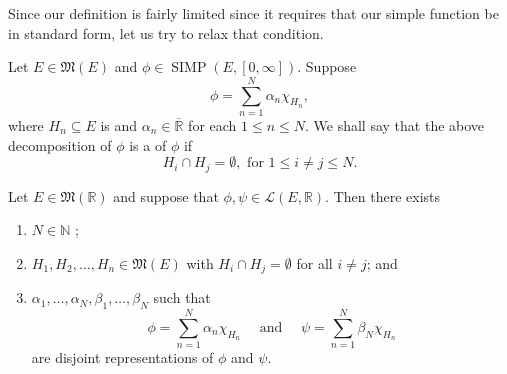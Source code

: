 \documentclass[notoc,notitlepage]{tufte-book}
\DeclareMathOperator{\SIMP}{SIMP}
\begin{document}
Since our definition is fairly limited since it requires that our simple
function be in standard form, let us try to relax that condition.

\begin{defn}\label{defn:disjoint_representation}
  Let $E \in \mathfrak{M}(E)$ and $\phi \in \SIMP(E, [0, \infty])$. Suppose
  \begin{equation*}
    \phi = \sum_{n=1}^{N} \alpha_n \chi_{H_n},
  \end{equation*}
  where $H_n \subseteq E$ is  and $\alpha_n \in
  \overline{\mathbb{R}}$ for each $1 \leq n \leq N$.  We shall say that the
  above decomposition of $\phi$ is a  of
  $\phi$ if
  \begin{equation*}
    H_i \cap H_j = \emptyset, \text{ for } 1 \leq i \neq j \leq N.
  \end{equation*}
\end{defn}

\begin{lemma}\label{lemma:common_disjoint_representation_of_simple_functions_over_a_common_domain}
  Let $E \in \mathfrak{M}(\mathbb{R})$ and suppose that $\phi, \psi \in
  \mathcal{L}(E, \mathbb{R})$. Then there exists
  \begin{enumerate}
    \item $N \in \mathbb{N}$ ;
    \item $H_1, H_2, \ldots, H_n \in \mathfrak{M}(E)$ with $H_i \cap H_j =
      \emptyset$ for all $i \neq j$; and
    \item $\alpha_1, \ldots, \alpha_N, \beta_1, \ldots, \beta_N$ such that
      \begin{equation*}
        \phi = \sum_{n=1}^{N} \alpha_n \chi_{H_n} \quad \text{ and } \quad
        \psi = \sum_{n=1}^{N} \beta_N \chi_{H_n}
      \end{equation*}
      are disjoint representations of $\phi$ and $\psi$.
  \end{enumerate}
\end{lemma}
\end{document}
